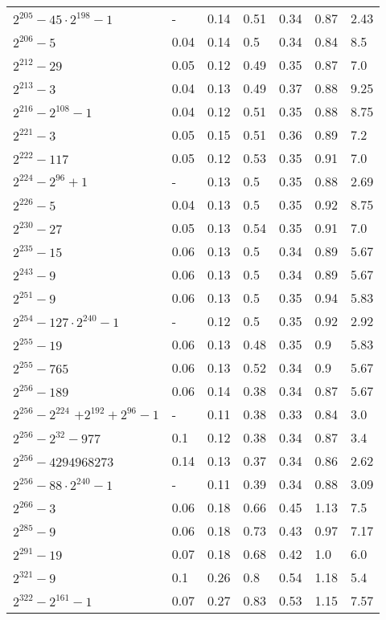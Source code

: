 \documentclass[conference,letterpaper]{IEEEtran}
\begin{document}
\begin{xtabular}{|l|p{0.475cm}|p{0.75cm}@{}|p{0.7cm}@{}|p{0.6cm}@{}|p{0.6cm}@{}|p{0.75cm}@{}|@{}}
	$2^{205}-45\cdot 2^{198}-1$ & - & 0.14 & 0.51 & 0.34 & 0.87 & 2.43 \\
	$2^{206}-5$ & 0.04 & 0.14 & 0.5 & 0.34 & 0.84 & 8.5 \\
	$2^{212}-29$ & 0.05 & 0.12 & 0.49 & 0.35 & 0.87 & 7.0 \\
	$2^{213}-3$ & 0.04 & 0.13 & 0.49 & 0.37 & 0.88 & 9.25 \\
	$2^{216}-2^{108}-1$ & 0.04 & 0.12 & 0.51 & 0.35 & 0.88 & 8.75 \\
	$2^{221}-3$ & 0.05 & 0.15 & 0.51 & 0.36 & 0.89 & 7.2 \\
	$2^{222}-117$ & 0.05 & 0.12 & 0.53 & 0.35 & 0.91 & 7.0 \\
	$2^{224}-2^{96}+1$ & - & 0.13 & 0.5 & 0.35 & 0.88 & 2.69 \\
	$2^{226}-5$ & 0.04 & 0.13 & 0.5 & 0.35 & 0.92 & 8.75 \\
	$2^{230}-27$ & 0.05 & 0.13 & 0.54 & 0.35 & 0.91 & 7.0 \\
	$2^{235}-15$ & 0.06 & 0.13 & 0.5 & 0.34 & 0.89 & 5.67 \\
	$2^{243}-9$ & 0.06 & 0.13 & 0.5 & 0.34 & 0.89 & 5.67 \\
	$2^{251}-9$ & 0.06 & 0.13 & 0.5 & 0.35 & 0.94 & 5.83 \\
	$2^{254}-127\cdot 2^{240}-1$ & - & 0.12 & 0.5 & 0.35 & 0.92 & 2.92 \\
	$2^{255}-19$ & 0.06 & 0.13 & 0.48 & 0.35 & 0.9 & 5.83 \\
	$2^{255}-765$ & 0.06 & 0.13 & 0.52 & 0.34 & 0.9 & 5.67 \\
	$2^{256}-189$ & 0.06 & 0.14 & 0.38 & 0.34 & 0.87 & 5.67 \\
	 & - & 0.11 & 0.38 & 0.33 & 0.84 & 3.0 \\
	$2^{256}-2^{32}-977$ & 0.1 & 0.12 & 0.38 & 0.34 & 0.87 & 3.4 \\
	$2^{256}-4294968273$ & 0.14 & 0.13 & 0.37 & 0.34 & 0.86 & 2.62 \\
	$2^{256}-88\cdot 2^{240}-1$ & - & 0.11 & 0.39 & 0.34 & 0.88 & 3.09 \\
	$2^{266}-3$ & 0.06 & 0.18 & 0.66 & 0.45 & 1.13 & 7.5 \\
	$2^{285}-9$ & 0.06 & 0.18 & 0.73 & 0.43 & 0.97 & 7.17 \\
	$2^{291}-19$ & 0.07 & 0.18 & 0.68 & 0.42 & 1.0 & 6.0 \\
	$2^{321}-9$ & 0.1 & 0.26 & 0.8 & 0.54 & 1.18 & 5.4 \\
	$2^{322}-2^{161}-1$ & 0.07 & 0.27 & 0.83 & 0.53 & 1.15 & 7.57 \\

\end{xtabular}
\end{document}
